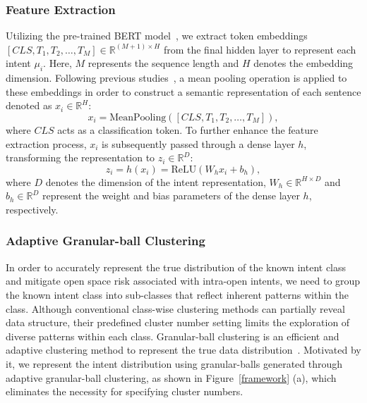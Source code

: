\documentclass[letterpaper]{article} %
\theoremstyle{definition}
\begin{document}
\subsubsection{Feature Extraction}\label{sec:3.2.1}
Utilizing the pre-trained BERT model~\cite{kenton2019bert}, we extract token embeddings $[CLS, T_1, T_2, \ldots, T_M] \in \mathbb{R}^{(M+1) \times H}$ from the final hidden layer to represent each intent $\mu_i$. Here, $M$ represents the sequence length and $H$ denotes the embedding dimension. Following previous studies~\cite{zhang2021deep}, a mean pooling operation is applied to these embeddings in order to construct a semantic representation of each sentence denoted as $x_i \in \mathbb{R}^H$:
\begin{equation}
x_i = \text{MeanPooling}([CLS, T_1, T_2, \ldots, T_M]),
\end{equation}
where $CLS$ acts as a classification token. To further enhance the feature extraction process, $x_i$ is subsequently passed through a dense layer $h$, transforming the representation to $z_i \in \mathbb{R}^D$:
\begin{equation}
z_i = h(x_i) = \text{ReLU}(W_h x_i + b_h),
\end{equation}
where $D$ denotes the dimension of the intent representation, $W_h \in \mathbb{R}^{H \times D}$ and $b_h \in \mathbb{R}^D$ represent the weight and bias parameters of the dense layer $h$, respectively. 

\subsubsection{Adaptive Granular-ball Clustering}\label{sec:cluster}
In order to accurately represent the true distribution of the known intent class and mitigate open space risk associated with intra-open intents, we need to group the known intent class into sub-classes that reflect inherent patterns within the class.
Although conventional class-wise clustering methods can partially reveal data structure, their predefined cluster number setting limits the exploration of diverse patterns within each class. 
Granular-ball clustering is an efficient and adaptive clustering method to represent the true data distribution~\cite{xia2021granular}.
Motivated by it, we represent the intent distribution using granular-balls generated through adaptive granular-ball clustering, as shown in Figure~\ref{framework} (a), which eliminates the necessity for specifying cluster numbers. 
\end{document}
